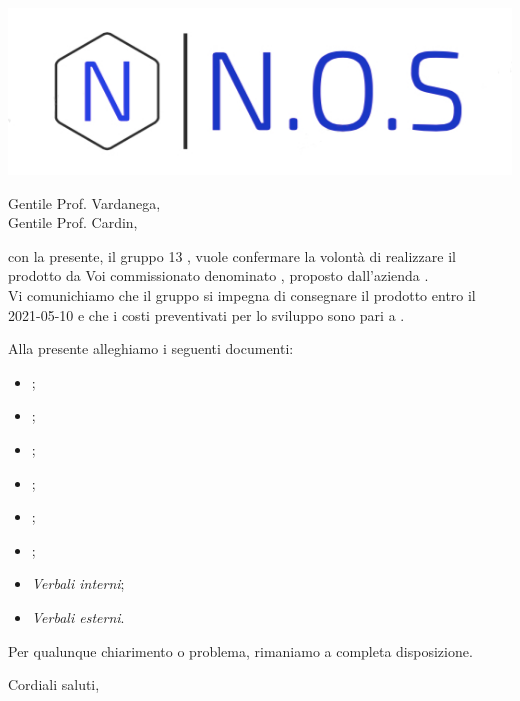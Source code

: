 \documentclass[12pt]{letter}
\date{11 gennaio 2021}
\begin{document}
\begin{letter}{ }

\includegraphics[scale=1.5
]{../../../Immagini/N.O.S.jpg}

\opening{Gentile Prof. Vardanega,\\ Gentile Prof. Cardin, }

con la presente, il gruppo 13  \Gruppo, vuole confermare la volontà di realizzare il prodotto da Voi commissionato denominato 
\textbf{\NomeProgetto}, proposto dall'azienda \Proponente. \\ 
Vi comunichiamo che il gruppo si impegna di consegnare il prodotto entro il 2021-05-10 e che i costi preventivati per lo sviluppo sono pari a .

Alla presente alleghiamo i seguenti documenti:

\begin{itemize}
	\item {};
	\item {};
	\item {};
	\item {};
	\item {};
	\item {};
	\item \textit{Verbali interni};
	\item \textit{Verbali esterni}.
\end{itemize}

Per qualunque chiarimento o problema, rimaniamo a completa disposizione.

\closing{Cordiali saluti, }

\vspace{2em}

\end{letter}
\end{document}

